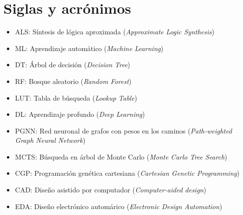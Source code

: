 \chapter*{Siglas y acrónimos}

\begin{itemize}
  \item ALS: Síntesis de lógica aproximada (\emph{Approximate Logic Synthesis})
  \item ML: Aprendizaje automático (\emph{Machine Learning})
  \item DT: Árbol de decisión (\emph{Decision Tree})
  \item RF: Bosque aleatorio (\emph{Random Forest})
  \item LUT: Tabla de búsqueda (\emph{Lookup Table})
  \item DL: Aprendizaje profundo (\emph{Deep Learning})
  \item PGNN: Red neuronal de grafos con pesos en los caminos (\emph{Path-weighted Graph Neural Network})
  \item MCTS: Búsqueda en árbol de Monte Carlo (\emph{Monte Carlo Tree Search})
  \item CGP: Programación genética cartesiana (\emph{Cartesian Genetic Programming})
  \item CAD: Diseño asistido por computador (\emph{Computer-aided design})
  \item EDA: Diseño electrónico automárico (\emph{Electronic Design Automation})
\end{itemize}
